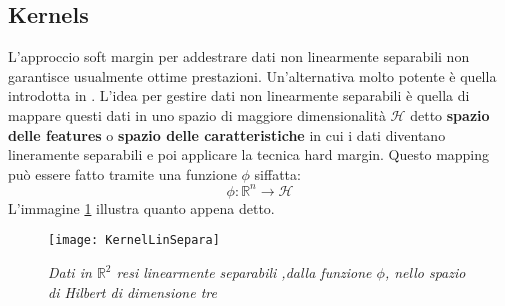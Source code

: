 \subsection{Kernels}
\label{sub:kernels}
L'approccio soft margin per addestrare dati non linearmente separabili non garantisce usualmente ottime prestazioni. Un'alternativa molto potente è quella introdotta in \cite{Vapnik92}. L'idea per gestire dati non linearmente separabili è quella di mappare questi dati in uno spazio di maggiore dimensionalità $\mathcal{H}$ detto \textbf{spazio delle features} o \textbf{spazio delle caratteristiche} in cui i dati diventano lineramente separabili e poi applicare la tecnica hard margin. Questo mapping può essere fatto tramite una funzione $\phi$ siffatta:
\begin{equation*}
\phi : \mathbb{R}^n \to \mathcal{H}
\end{equation*}
L'immagine \ref{fig:kls} illustra quanto appena detto. 

\begin{figure}[htp]
	\centering
	\texttt{[image: KernelLinSepara]}
	\caption[Mapping in feature space]{\textit{Dati in $\mathbb{R}^{2}$ resi linearmente separabili ,dalla funzione $\phi$, nello spazio di Hilbert di dimensione tre}}
   \label{fig:kls}
\end{figure}

